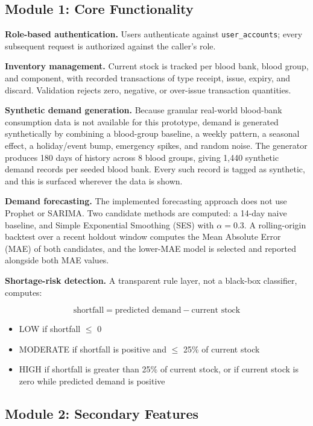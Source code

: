 \documentclass[12pt,twoside]{report}
\begin{document}
\subsection{Module 1: Core Functionality}

\textbf{Role-based authentication.} Users authenticate against \texttt{user\_accounts}; every subsequent request is authorized against the caller's role.

\textbf{Inventory management.} Current stock is tracked per blood bank, blood group, and component, with recorded transactions of type receipt, issue, expiry, and discard. Validation rejects zero, negative, or over-issue transaction quantities.

\textbf{Synthetic demand generation.} Because granular real-world blood-bank consumption data is not available for this prototype, demand is generated synthetically by combining a blood-group baseline, a weekly pattern, a seasonal effect, a holiday/event bump, emergency spikes, and random noise. The generator produces 180 days of history across 8 blood groups, giving 1,440 synthetic demand records per seeded blood bank. Every such record is tagged as synthetic, and this is surfaced wherever the data is shown.

\textbf{Demand forecasting.} The implemented forecasting approach does not use Prophet or SARIMA. Two candidate methods are computed: a 14-day naive baseline, and Simple Exponential Smoothing (SES) with $\alpha = 0.3$. A rolling-origin backtest over a recent holdout window computes the Mean Absolute Error (MAE) of both candidates, and the lower-MAE model is selected and reported alongside both MAE values.

\textbf{Shortage-risk detection.} A transparent rule layer, not a black-box classifier, computes:

\[
\text{shortfall} = \text{predicted demand} - \text{current stock}
\]

\begin{itemize}[itemsep=0pt]
\item LOW if shortfall $\leq$ 0
\item MODERATE if shortfall is positive and $\leq$ 25\% of current stock
\item HIGH if shortfall is greater than 25\% of current stock, or if current stock is zero while predicted demand is positive
\end{itemize}

\subsection{Module 2: Secondary Features}
\end{document}
